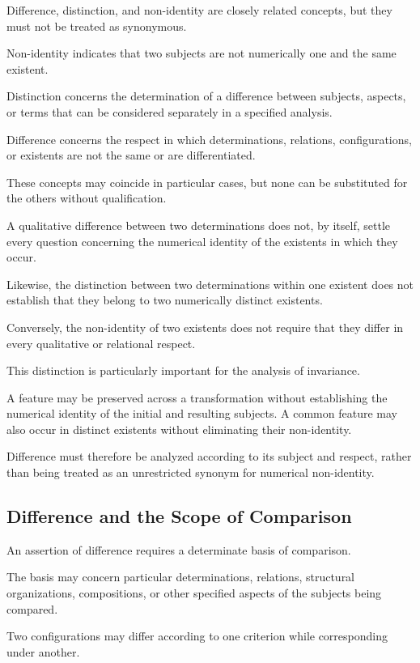 Difference, distinction, and non-identity are
closely related concepts, but they must not
be treated as synonymous.

Non-identity indicates that two subjects are
not numerically one and the same existent.

Distinction concerns the determination of
a difference between subjects, aspects, or
terms that can be considered separately
in a specified analysis.

Difference concerns the respect in which
determinations, relations, configurations,
or existents are not the same or are
differentiated.

These concepts may coincide in particular
cases, but none can be substituted for
the others without qualification.

A qualitative difference between two
determinations does not, by itself, settle
every question concerning the numerical
identity of the existents in which they occur.

Likewise, the distinction between two
determinations within one existent does
not establish that they belong to two
numerically distinct existents.

Conversely, the non-identity of two existents
does not require that they differ in every
qualitative or relational respect.

This distinction is particularly important
for the analysis of invariance.

A feature may be preserved across a
transformation without establishing the
numerical identity of the initial and
resulting subjects. A common feature may
also occur in distinct existents without
eliminating their non-identity.

Difference must therefore be analyzed
according to its subject and respect,
rather than being treated as an unrestricted
synonym for numerical non-identity.

\subsection{Difference and the Scope of Comparison}

An assertion of difference requires a
determinate basis of comparison.

The basis may concern particular
determinations, relations, structural
organizations, compositions, or other
specified aspects of the subjects being
compared.

Two configurations may differ according
to one criterion while corresponding
under another.

